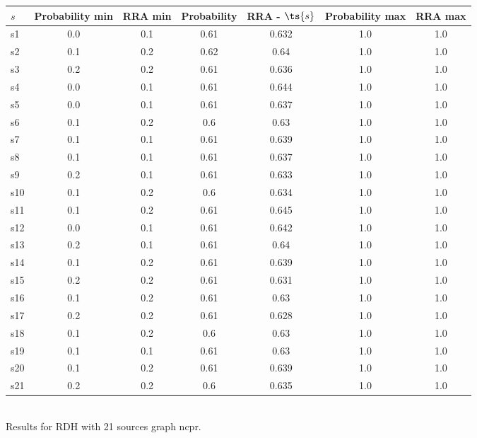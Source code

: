 \documentclass{article}
\begin{document}
\noindent\begin{tabular}{|l|c|c|c|c|c|c|}
\hline
$s$& Probability min & RRA min & Probability & RRA - $\ts{s}$ & Probability max & RRA max\\
\hline
s1 &0.0 & 0.1 & 0.61 & 0.632 & 1.0 & 1.0\\
\hline
s2 &0.1 & 0.2 & 0.62 & 0.64 & 1.0 & 1.0\\
\hline
s3 &0.2 & 0.2 & 0.61 & 0.636 & 1.0 & 1.0\\
\hline
s4 &0.0 & 0.1 & 0.61 & 0.644 & 1.0 & 1.0\\
\hline
s5 &0.0 & 0.1 & 0.61 & 0.637 & 1.0 & 1.0\\
\hline
s6 &0.1 & 0.2 & 0.6 & 0.63 & 1.0 & 1.0\\
\hline
s7 &0.1 & 0.1 & 0.61 & 0.639 & 1.0 & 1.0\\
\hline
s8 &0.1 & 0.1 & 0.61 & 0.637 & 1.0 & 1.0\\
\hline
s9 &0.2 & 0.1 & 0.61 & 0.633 & 1.0 & 1.0\\
\hline
s10 &0.1 & 0.2 & 0.6 & 0.634 & 1.0 & 1.0\\
\hline
s11 &0.1 & 0.2 & 0.61 & 0.645 & 1.0 & 1.0\\
\hline
s12 &0.0 & 0.1 & 0.61 & 0.642 & 1.0 & 1.0\\
\hline
s13 &0.2 & 0.1 & 0.61 & 0.64 & 1.0 & 1.0\\
\hline
s14 &0.1 & 0.2 & 0.61 & 0.639 & 1.0 & 1.0\\
\hline
s15 &0.2 & 0.2 & 0.61 & 0.631 & 1.0 & 1.0\\
\hline
s16 &0.1 & 0.2 & 0.61 & 0.63 & 1.0 & 1.0\\
\hline
s17 &0.2 & 0.2 & 0.61 & 0.628 & 1.0 & 1.0\\
\hline
s18 &0.1 & 0.2 & 0.6 & 0.63 & 1.0 & 1.0\\
\hline
s19 &0.1 & 0.1 & 0.61 & 0.63 & 1.0 & 1.0\\
\hline
s20 &0.1 & 0.2 & 0.61 & 0.639 & 1.0 & 1.0\\
\hline
s21 &0.2 & 0.2 & 0.6 & 0.635 & 1.0 & 1.0\\
\hline
\end{tabular}\\

\noindent Results for RDH with 21 sources graph ncpr.
\end{document}

